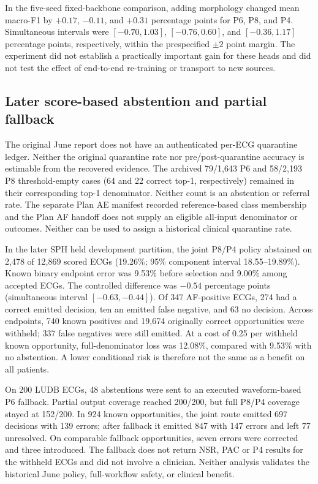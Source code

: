 \documentclass[life,article,submit,moreauthors]{Definitions/mdpi}
\begin{document}
In the five-seed fixed-backbone comparison, adding morphology changed mean macro-F1 by $+0.17$, $-0.11$, and $+0.31$ percentage points for P6, P8, and P4. Simultaneous intervals were $[-0.70,1.03]$, $[-0.76,0.60]$, and $[-0.36,1.17]$ percentage points, respectively, within the prespecified $\pm2$ point margin. The experiment did not establish a practically important gain for these heads and did not test the effect of end-to-end re-training or transport to new sources.

\subsection{Later score-based abstention and partial fallback}
\label{sec:selective-results}

The original June report does not have an authenticated per-ECG quarantine ledger. Neither the original quarantine rate nor pre/post-quarantine accuracy is estimable from the recovered evidence. The archived 79/1,643 P6 and 58/2,193 P8 threshold-empty cases (64 and 22 correct top-1, respectively) remained in their corresponding top-1 denominator. Neither count is an abstention or referral rate. The separate Plan AE manifest recorded reference-based class membership and the Plan AF handoff does not supply an eligible all-input denominator or outcomes. Neither can be used to assign a historical clinical quarantine rate.

In the later SPH held development partition, the joint P8/P4 policy abstained on 2,478 of 12,869 scored ECGs (19.26\%; 95\% component interval 18.55--19.89\%). Known binary endpoint error was 9.53\% before selection and 9.00\% among accepted ECGs. The controlled difference was $-0.54$ percentage points (simultaneous interval $[-0.63,-0.44]$). Of 347 AF-positive ECGs, 274 had a correct emitted decision, ten an emitted false negative, and 63 no decision. Across endpoints, 740 known positives and 19,674 originally correct opportunities were withheld; 337 false negatives were still emitted. At a cost of 0.25 per withheld known opportunity, full-denominator loss was 12.08\%, compared with 9.53\% with no abstention. A lower conditional risk is therefore not the same as a benefit on all patients.

On 200 LUDB ECGs, 48 abstentions were sent to an executed waveform-based P6 fallback. Partial output coverage reached 200/200, but full P8/P4 coverage stayed at 152/200. In 924 known opportunities, the joint route emitted 697 decisions with 139 errors; after fallback it emitted 847 with 147 errors and left 77 unresolved. On comparable fallback opportunities, seven errors were corrected and three introduced. The fallback does not return NSR, PAC or P4 results for the withheld ECGs and did not involve a clinician. Neither analysis validates the historical June policy, full-workflow safety, or clinical benefit.
\end{document}
